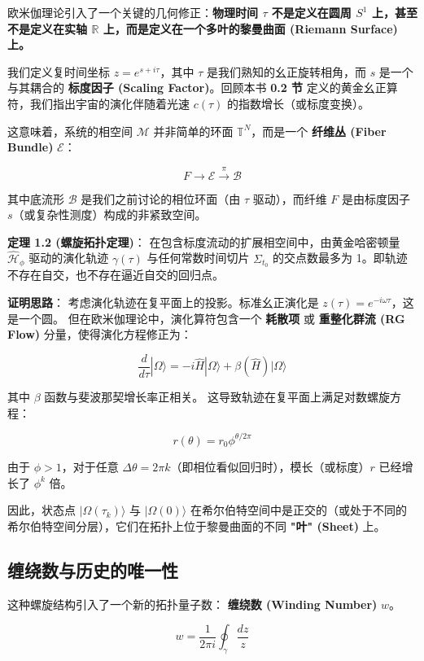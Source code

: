 欧米伽理论引入了一个关键的几何修正：\textbf{物理时间 $\tau$ 不是定义在圆周 $S^1$ 上，甚至不是定义在实轴 $\mathbb{R}$ 上，而是定义在一个多叶的黎曼曲面 (Riemann Surface) 上。}

我们定义复时间坐标 $z = e^{s + i\tau}$，其中 $\tau$ 是我们熟知的幺正旋转相角，而 $s$ 是一个与其耦合的 \textbf{标度因子 (Scaling Factor)}。回顾本书 \textbf{0.2 节} 定义的黄金幺正算符，我们指出宇宙的演化伴随着光速 $c(\tau)$ 的指数增长（或标度变换）。

这意味着，系统的相空间 $\mathcal{M}$ 并非简单的环面 $\mathbb{T}^N$，而是一个 \textbf{纤维丛 (Fiber Bundle)} $\mathcal{E}$：

\[F \to \mathcal{E} \xrightarrow{\pi} \mathcal{B}\]

其中底流形 $\mathcal{B}$ 是我们之前讨论的相位环面（由 $\tau$ 驱动），而纤维 $F$ 是由标度因子 $s$（或复杂性测度）构成的非紧致空间。

\textbf{定理 1.2 (螺旋拓扑定理)}：
在包含标度流动的扩展相空间中，由黄金哈密顿量 $\hat{\mathcal{H}}_\phi$ 驱动的演化轨迹 $\gamma(\tau)$ 与任何常数时间切片 $\Sigma_{t_0}$ 的交点数最多为 1。即轨迹不存在自交，也不存在逼近自交的回归点。

\textbf{证明思路}：
考虑演化轨迹在复平面上的投影。标准幺正演化是 $z(\tau) = e^{-i\omega \tau}$，这是一个圆。
但在欧米伽理论中，演化算符包含一个 \textbf{耗散项} 或 \textbf{重整化群流 (RG Flow)} 分量，使得演化方程修正为：

\[\frac{d}{d\tau} |\Omega\rangle = -i \hat{H} |\Omega\rangle + \beta(\hat{H}) |\Omega\rangle\]

其中 $\beta$ 函数与斐波那契增长率正相关。
这导致轨迹在复平面上满足对数螺旋方程：

\[r(\theta) = r_0 \phi^{\theta/2\pi}\]

由于 $\phi > 1$，对于任意 $\Delta \theta = 2\pi k$（即相位看似回归时），模长（或标度）$r$ 已经增长了 $\phi^k$ 倍。

因此，状态点 $|\Omega(\tau_k)\rangle$ 与 $|\Omega(0)\rangle$ 在希尔伯特空间中是正交的（或处于不同的希尔伯特空间分层），它们在拓扑上位于黎曼曲面的不同 \textbf{"叶" (Sheet)} 上。

\subsection{缠绕数与历史的唯一性}

这种螺旋结构引入了一个新的拓扑量子数： \textbf{缠绕数 (Winding Number)} $w$。

\[w = \frac{1}{2\pi i} \oint_{\gamma} \frac{dz}{z}\]

